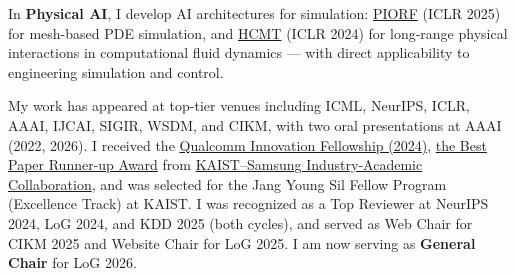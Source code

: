 \documentclass[10pt]{article}
\newenvironment{changemargin}[2]{
  \begin{list}{}{
    \setlength{\topsep}{0pt}
    \setlength{\leftmargin}{#1}
    \setlength{\rightmargin}{#2}
    \setlength{\listparindent}{\parindent}
    \setlength{\itemindent}{\parindent}
    \setlength{\parsep}{\parskip}
  }
  \item[]}{\end{list}
}
\newenvironment{body} {
	\vspace*{-16pt}
	\begin{changemargin}{-0.25in}{-0.5in}
  }
	{\end{changemargin}
}
\begin{document}
\begin{body}
    \; In \textbf{Physical AI}, I develop AI architectures for simulation: \href{https://openreview.net/forum?id=tJTtzKrzxK}{PIORF} (ICLR 2025) for mesh-based PDE simulation, and \href{https://openreview.net/forum?id=90yw2uM6J5}{HCMT} (ICLR 2024) for long-range physical interactions in computational fluid dynamics --- with direct applicability to engineering simulation and control.
    
    
    My work has appeared at top-tier venues including ICML, NeurIPS, ICLR, AAAI, IJCAI, SIGIR, WSDM, and CIKM, with two oral presentations at AAAI (2022, 2026). 
    I received the \href{https://www.qualcomm.com/research/university-relations/innovation-fellowship/2024-south-korea}{Qualcomm Innovation Fellowship (2024)}, \href{https://www.jeongwhanchoi.com/assets/award/KAIST-SAMSUNG-BESTPAPER-RUNNERUP.pdf}{the Best Paper Runner-up Award} from \href{https://research.kaist.ac.kr/page/ko/selectPage.do?menuSeq=3605&pageSeq=3685}{KAIST–Samsung Industry-Academic Collaboration}, and was selected for the Jang Young Sil Fellow Program (Excellence Track) at KAIST. I was recognized as a Top Reviewer at NeurIPS 2024, LoG 2024, and KDD 2025 (both cycles), and served as Web Chair for CIKM 2025 and Website Chair for LoG 2025. I am now serving as \textbf{General Chair} for LoG 2026.
\end{body}
\medskip
\end{document}
